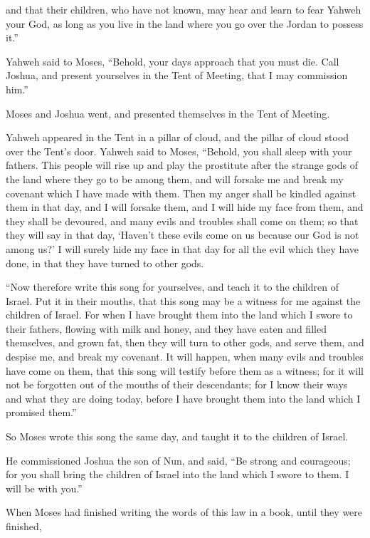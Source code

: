 {and that their children, who have not known, may hear and learn to fear Yahweh your God, as long as you live in the land where you go over the Jordan to possess it.”
\par }{\PP {}Yahweh said to Moses, “Behold, your days approach that you must die. Call Joshua, and present yourselves in the Tent of Meeting, that I may commission him.”
\par }{\PP Moses and Joshua went, and presented themselves in the Tent of Meeting.
\par }{\PP {}Yahweh appeared in the Tent in a pillar of cloud, and the pillar of cloud stood over the Tent’s door.
Yahweh said to Moses, “Behold, you shall sleep with your fathers. This people will rise up and play the prostitute after the strange gods of the land where they go to be among them, and will forsake me and break my covenant which I have made with them.
Then my anger shall be kindled against them in that day, and I will forsake them, and I will hide my face from them, and they shall be devoured, and many evils and troubles shall come on them; so that they will say in that day, ‘Haven’t these evils come on us because our God is not among us?’
I will surely hide my face in that day for all the evil which they have done, in that they have turned to other gods.
\par }{\PP {}“Now therefore write this song for yourselves, and teach it to the children of Israel. Put it in their mouths, that this song may be a witness for me against the children of Israel.
For when I have brought them into the land which I swore to their fathers, flowing with milk and honey, and they have eaten and filled themselves, and grown fat, then they will turn to other gods, and serve them, and despise me, and break my covenant.
It will happen, when many evils and troubles have come on them, that this song will testify before them as a witness; for it will not be forgotten out of the mouths of their descendants; for I know their ways and what they are doing today, before I have brought them into the land which I promised them.”
\par }{\PP {}So Moses wrote this song the same day, and taught it to the children of Israel.
\par }{\PP {}He commissioned Joshua the son of Nun, and said, “Be strong and courageous; for you shall bring the children of Israel into the land which I swore to them. I will be with you.”
\par }{\PP {}When Moses had finished writing the words of this law in a book, until they were finished,
}
